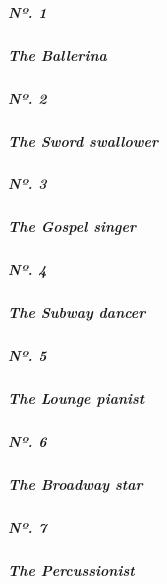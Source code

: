 \hypertarget{nuxba-1}{%
\subparagraph{Nº. 1}\label{nuxba-1}}

\hypertarget{the-ballerina}{%
\subparagraph{The Ballerina}\label{the-ballerina}}

\href{https://www.nytimes3xbfgragh.onion/interactive/2019/05/30/magazine/sword-swallowing-new-york.html}{}

\hypertarget{nuxba-2}{%
\subparagraph{Nº. 2}\label{nuxba-2}}

\hypertarget{the-sword-swallower}{%
\subparagraph{The Sword swallower}\label{the-sword-swallower}}

\href{https://www.nytimes3xbfgragh.onion/interactive/2019/05/30/magazine/gospel-singer-new-york.html}{}

\hypertarget{nuxba-3}{%
\subparagraph{Nº. 3}\label{nuxba-3}}

\hypertarget{the-gospel-singer}{%
\subparagraph{The Gospel singer}\label{the-gospel-singer}}

\href{https://www.nytimes3xbfgragh.onion/interactive/2019/05/30/magazine/subway-dance-new-york.html}{}

\hypertarget{nuxba-4}{%
\subparagraph{Nº. 4}\label{nuxba-4}}

\hypertarget{the-subway-dancer}{%
\subparagraph{The Subway dancer}\label{the-subway-dancer}}

\href{https://www.nytimes3xbfgragh.onion/interactive/2019/05/30/magazine/earl-rose-piano-carlyle-new-york.html}{}

\hypertarget{nuxba-5}{%
\subparagraph{Nº. 5}\label{nuxba-5}}

\hypertarget{the-lounge-pianist}{%
\subparagraph{The Lounge pianist}\label{the-lounge-pianist}}

\href{https://www.nytimes3xbfgragh.onion/interactive/2019/05/30/magazine/broadway-kiss-me-kate.html}{}

\hypertarget{nuxba-6}{%
\subparagraph{Nº. 6}\label{nuxba-6}}

\hypertarget{the-broadway-star}{%
\subparagraph{The Broadway star}\label{the-broadway-star}}

\href{https://www.nytimes3xbfgragh.onion/interactive/2019/05/30/magazine/latin-beat-new-york.html}{}

\hypertarget{nuxba-7}{%
\subparagraph{Nº. 7}\label{nuxba-7}}

\hypertarget{the-percussionist}{%
\subparagraph{The Percussionist}\label{the-percussionist}}

\href{https://www.nytimes3xbfgragh.onion/interactive/2019/05/30/magazine/female-comedy-new-york.html}{}

